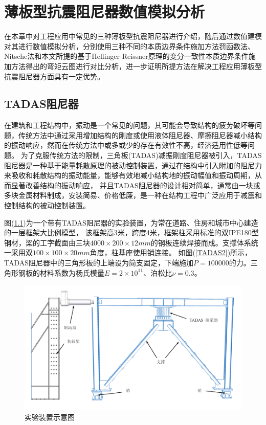 \chapter{薄板型抗震阻尼器数值模拟分析}
在本章中对工程应用中常见的三种薄板型抗震阻尼器进行介绍，随后通过数值建模对其进行数值模拟分析，分别使用三种不同的本质边界条件施加方法罚函数法、Nitsche法和本文所提的基于Hellinger-Reissner原理的变分一致性本质边界条件施加方法得出的弯矩云图进行对比分析，进一步证明所提方法在解决工程应用薄板型抗震阻尼器方面具有一定优势。
\section{TADAS阻尼器}
在建筑和工程结构中，振动是一个常见的问题，其可能会导致结构的疲劳破坏等问题，传统方法中通过采用增加结构的刚度或使用液体阻尼器、摩擦阻尼器减小结构的振动响应，然而在传统方法中或多或少的存在有效性不高，经济适用性低等问题。
为了克服传统方法的限制，三角板(TADAS)减振刚度阻尼器被引入，TADAS阻尼器是一种基于能量耗散原理的被动控制装置，通过在结构中引入附加的阻尼力来吸收和耗散结构的振动能量，能够有效地减小结构地的振动幅值和振动周期，从而显著改善结构的振动响应，
并且TADAS阻尼器的设计相对简单，通常由一块或多块金属材料制成，安装简易、价格低廉，是一种在结构工程中广泛应用于减震和控制结构的被动控制装置。\par
图(\ref{TADAS1})为一个带有TADAS阻尼器的实验装置\cite{mohammadi2017,kim2016}，为常在道路、住房和城市中心建造的一层框架大比例模型，
该框架高3米，跨度4米，框架柱采用标准的双IPE180型钢材，梁的工字截面由三块$4000\times200\times12mm$的钢板连续焊接而成。支撑体系统一采用双$100\times100\times20mm$角度，柱基座使用销连接。
如图(\ref{TADAS2})所示，TADAS阻尼器中的三角形板的上端设为简支固定，下端施加$P=100000$的力。三角形钢板的材料系数为杨氏模量$E=2\times 10^{11}$、泊松比$\nu=0.3$。
\begin{figure}[H]
    \centering
    \includegraphics[scale=0.4]{figure/DAMPER/TADAS/1.png}
    \caption{实验装置示意图\cite{mohammadi2017}}\label{TADAS1}
\end{figure}

